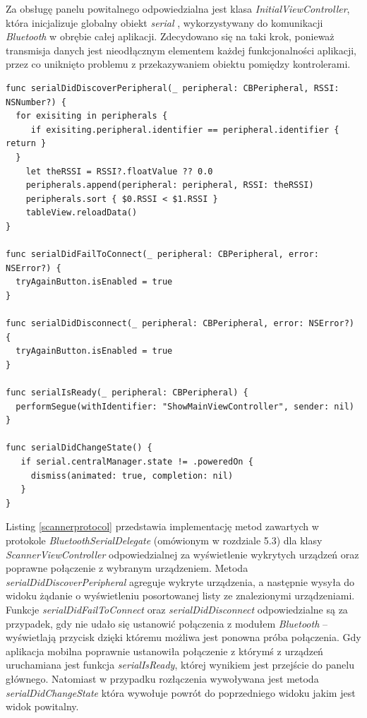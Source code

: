 Za obsługę panelu powitalnego odpowiedzialna jest klasa \textit{InitialViewController}, która inicjalizuje globalny obiekt \textit{serial} , wykorzystywany do komunikacji \textit{Bluetooth} w obrębie całej aplikacji. Zdecydowano się na taki krok, ponieważ transmisja danych jest nieodłącznym elementem każdej funkcjonalności aplikacji, przez co uniknięto problemu z przekazywaniem obiektu pomiędzy kontrolerami.

\begin{minipage}{\textwidth}
	\begin{lstlisting}[label=scannerprotocol,caption=Implementacja protokołu.]
func serialDidDiscoverPeripheral(_ peripheral: CBPeripheral, RSSI: NSNumber?) {
  for exisiting in peripherals {
     if exisiting.peripheral.identifier == peripheral.identifier { return }
  }
    let theRSSI = RSSI?.floatValue ?? 0.0
    peripherals.append(peripheral: peripheral, RSSI: theRSSI)
    peripherals.sort { $0.RSSI < $1.RSSI }
    tableView.reloadData()
}
  
func serialDidFailToConnect(_ peripheral: CBPeripheral, error: NSError?) {
  tryAgainButton.isEnabled = true
}
  
func serialDidDisconnect(_ peripheral: CBPeripheral, error: NSError?) {
  tryAgainButton.isEnabled = true
}
  
func serialIsReady(_ peripheral: CBPeripheral) {
  performSegue(withIdentifier: "ShowMainViewController", sender: nil)
}
  
func serialDidChangeState() {
   if serial.centralManager.state != .poweredOn {
     dismiss(animated: true, completion: nil)
   }
}
	\end{lstlisting}
\end{minipage}

Listing \ref{scannerprotocol} przedstawia implementację metod zawartych w protokole \textit{BluetoothSerialDelegate} (omówionym w rozdziale 5.3) dla klasy \textit{ScannerViewController} odpowiedzialnej za wyświetlenie wykrytych urządzeń oraz poprawne połączenie z wybranym urządzeniem. Metoda \textit{serialDidDiscoverPeripheral} agreguje wykryte urządzenia, a następnie wysyła do widoku żądanie o wyświetleniu posortowanej listy ze znalezionymi urządzeniami. Funkcje \textit{serialDidFailToConnect} oraz \textit{serialDidDisconnect} odpowiedzialne są za przypadek, gdy nie udało się ustanowić połączenia z modułem \textit{Bluetooth} – wyświetlają przycisk dzięki któremu możliwa jest ponowna próba połączenia. Gdy aplikacja mobilna poprawnie ustanowiła połączenie z którymś z urządzeń uruchamiana jest funkcja \textit{serialIsReady}, której wynikiem jest przejście do panelu głównego.  Natomiast w przypadku rozłączenia wywoływana jest metoda \textit{serialDidChangeState} która wywołuje powrót do poprzedniego widoku jakim jest widok powitalny.

